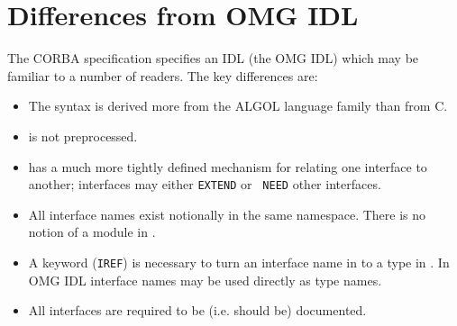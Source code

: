 \section{Differences from OMG IDL}

The CORBA specification specifies an IDL (the OMG IDL) which may be
familiar to a number of readers. The key differences are:

\begin{itemize}
\item The syntax is derived more from the ALGOL language family than
from C.
\item \MIDDL{} is not preprocessed. 
\item \MIDDL{} has a much more tightly defined mechanism for relating one
interface to another; \MIDDL{} interfaces may either {\tt EXTEND} or {\tt
NEED} other interfaces. 
\item All \MIDDL{} interface names exist notionally in the same namespace. There is no notion of a module in \MIDDL{}.
\item A keyword ({\tt IREF}) is necessary to turn an interface name in
to a type in \MIDDL{}. In OMG IDL interface names may be used
directly as type names.
\item All \MIDDL{} interfaces are required to be (i.e. should be) documented.
\end{itemize}

%

